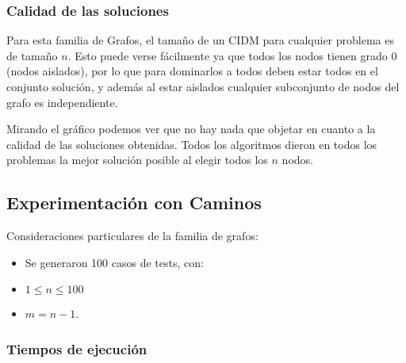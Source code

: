 \subsubsection{Calidad de las soluciones}
\begin{center}
\end{center}

Para esta familia de Grafos, el tamaño de un CIDM para cualquier problema es de tamaño $n$. Esto puede verse fácilmente ya que todos los nodos tienen grado $0$ (nodos aislados), por lo que para dominarlos a todos deben estar todos en el conjunto solución, y además al estar aislados cualquier subconjunto de nodos del grafo es independiente.

Mirando el gráfico podemos ver que no hay nada que objetar en cuanto a la calidad de las soluciones obtenidas. Todos los algoritmos dieron en todos los problemas la mejor solución posible al elegir todos los $n$ nodos.

\subsection{Experimentación con Caminos}

Consideraciones particulares de la familia de grafos:
\begin{itemize}
    \item Se generaron 100 casos de tests, con:
    \item $1 \leq n \leq 100$
    \item $m = n-1$.
\end{itemize}

\subsubsection{Tiempos de ejecución}

